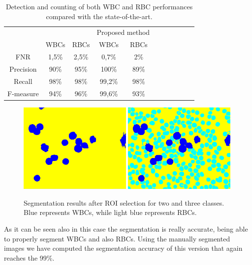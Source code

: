 \documentclass[final,a4paper,12pt,english]{UnicaPhdThesis3}
\begin{document}
{\begin{table}[h]
	\centering\tabcolsep=1mm
	\begin{tabular}{ccccccccccc}
		\hline
		&\multicolumn{2}{c}{\cite{Alomari}} 	&\multicolumn{2}{c}{Proposed method}\\
		& 	WBCs 		& RBCs 						&	WBCs 		& 	RBCs \\
		\hline
		FNR			&	1,5\% 		&  2,5\%					&	0,7\% 		&  2\%\\
		Precision &	90\% 		&  95\% 					&	100\% 		&  89\%\\
		Recall		& 	98\% 		&  98\% 					&	 99,2\% 	&  98\%\\
		F-measure 	& 	94\% 		&  96\%						&	 99,6\% 	&  93\%\\
		\hline
	\end{tabular} 
	\label{tab:table2}
	\caption{Detection and counting of both WBC and RBC performances compared with the state-of-the-art.}
\end{table}

\begin{figure}[h]
	\centering
	\includegraphics[width=0.49\textwidth]{images/2015_1_caip/ROI4}
	\includegraphics[width=0.49\textwidth]{images/2015_1_caip/ROI5}
	\caption{\label{fig:ex7}Segmentation results after ROI selection for two and three classes. Blue represents WBCs, while light blue represents RBCs.}
\end{figure}

As it can be seen also in this case the segmentation is really accurate, being able to properly segment WBCs and also RBCs. Using the manually segmented images we have computed the segmentation accuracy of this version that again reaches the 99\%. 

}
\end{document}
